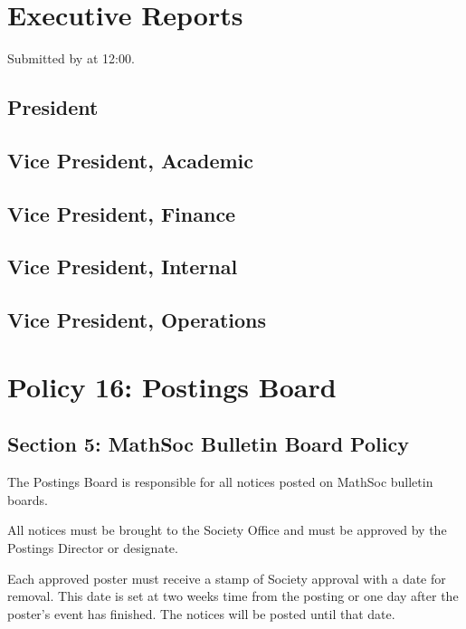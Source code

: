 \documentclass[12pt, letterpaper]{article}
\begin{document}
\newpage


\newpage
\section*{Executive Reports}
Submitted by \agendaDate at 12:00.

\subsection*{President}


\subsection*{Vice President, Academic}


\subsection*{Vice President, Finance}


\subsection*{Vice President, Internal}


\subsection*{Vice President, Operations}


\newpage
{}
\section*{Policy 16: Postings Board}
\subsection*{Section 5: MathSoc Bulletin Board Policy}

The Postings Board is responsible for all notices posted on MathSoc bulletin boards.

All notices must be brought to the Society Office and must be approved by the Postings Director or designate.

Each approved poster must receive a stamp of Society approval with a date for removal. This date is set at two weeks time from the posting or one day after the poster's event has finished. The notices will be posted until that date.
\end{document}
